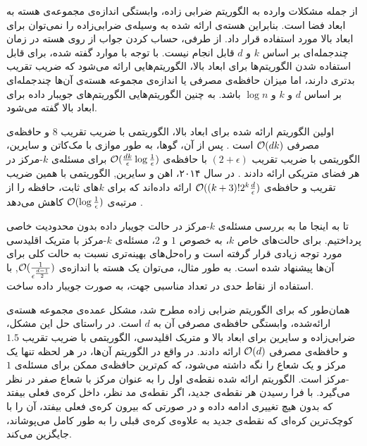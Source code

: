 از جمله مشکلات وارده به الگوریتم ضرابی زاده، وابستگی اندازه‌ی مجموعه‌ی هسته به ابعاد فضا است. بنابراین هسته‌ی ارائه شده به وسیله‌ی ضرابی‌زاده را نمی‌توان برای ابعاد بالا مورد استفاده قرار داد. از طرفی، حساب کردن جواب از روی هسته در زمان چند‌جمله‌ای بر اساس $k$ و $d$ قابل انجام نیست. با توجه با موارد گفته شده، برای قابل استفاده شدن الگوریتم‌ها برای ابعاد بالا، الگوریتم‌هایی ارائه می‌شود که ضریب تقریب بدتری دارند، اما میزان حافظه‌ی مصرفی یا اندازه‌ی مجموعه هسته‌‌ی آن‌ها چندجمله‌ای بر اساس $d$ و $k$ و $\log{n}$ باشد. به چنین الگوریتم‌هایی الگوریتم‌های جویبار داده برای ابعاد بالا گفته می‌شود. 

اولین الگوریتم ارائه شده برای ابعاد بالا،  الگوریتمی با ضریب تقریب $8$ و حافظه‌ی مصرفی $\mathcal{O}(dk)$ است . پس از آن، گوها، به طور موازی با مک‌کاتن و سایرین، الگوریتمی با ضریب تقریب $(2+\epsilon)$ با حافظه‌ی $\mathcal{O}(\frac{dk}{\epsilon} \log{\frac{1}{\epsilon}})$ برای مسئله‌ی $k$-مرکز در هر فضای متریکی ارائه دادند . در سال ۲۰۱۴، اهن و سایرین, الگوریتمی با همین ضریب تقریب و حافظه‌ی $\mathcal{O}((k+3)!2^k\frac{d}{\epsilon})$ ارائه داده‌اند که برای $k$‌های ثابت، حافظه را از مرتبه‌ی $\mathcal{O}(\log{\frac{1}{\epsilon}})$ کاهش می‌دهد . 

تا به اینجا ما به بررسی مسئله‌ی $k$-مرکز‌ در حالت جویبار داده بدون محدودیت خاصی پرداختیم. برای حالت‌های خاص $k$، به خصوص $1$ و $2$، مسئله‌ی $k$-مرکز با متریک اقلیدسی مورد توجه زیادی قرار گرفته است و راه‌حل‌های بهینه‌تری نسبت به حالت کلی برای آن‌ها پیشنهاد شده است. به طور مثال، می‌توان یک هسته با اندازه‌ی‌ $\mathcal{O}(\frac{1}{\epsilon^{\frac{d-1}{2}}})$, با استفاده از نقاط حدی در تعداد مناسبی جهت، به صورت جویبار داده ساخت. 

همان‌طور که برای الگوریتم ضرابی زاده مطرح شد، مشکل عمده‌ی مجموعه هسته‌ی ارائه‌شده، وابستگی حافظه‌ی مصرفی آن به $d$ است. در راستای حل این مشکل، ضرابی‌زاده و سایرین  برای ابعاد بالا و متریک اقلیدسی، الگوریتمی با ضریب تقریب $1.5$ و حافظه‌ی مصرفی $\mathcal{O}(d)$ ارائه دادند. در واقع در الگوریتم آن‌ها، در هر لحظه تنها یک مرکز و یک شعاع را نگه داشته می‌شود، که کم‌ترین حافظه‌ی ممکن برای مسئله‌ی $1$-مرکز است. الگوریتم ارائه شده نقطه‌ی اول را به عنوان مرکز با شعاع صفر در نظر می‌گیرد. با فرا رسیدن هر نقطه‌ی جدید، اگر نقطه‌ی مد نظر، داخل کره‌ی فعلی بیفتد که بدون هیچ‌ تغییری ادامه داده و در صورتی که بیرون کره‌ی فعلی بیفتد، آن را با کوچک‌ترین کره‌ای که نقطه‌ی جدید به علاوه‌ی کره‌ی قبلی را به طور کامل می‌پوشاند، جایگزین می‌کند. 

